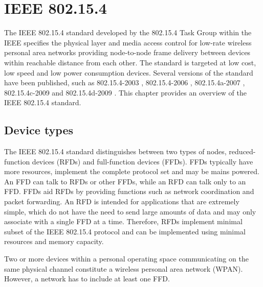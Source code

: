 \documentclass[12pt, titlepage, a4paper]{report}
\begin{document}
\chapter{IEEE 802.15.4}\label{ch:ieee802.15.4}
The IEEE 802.15.4 standard developed by the 802.15.4 Task Group within the IEEE specifies the physical layer and media access control for low-rate wireless personal area networks providing node-to-node frame delivery between devices within reachable distance from each other. The standard is targeted at low cost, low speed and low power consumption devices. Several versions of the standard have been published, such as 802.15.4-2003 \cite{ieee802.15.4}, 802.15.4-2006 \cite{ieee802.15.4-2006}, 802.15.4a-2007 \cite{ieee802.15.4a-2007}, 802.15.4c-2009 \cite{ieee802.15.4c-2009} and 802.15.4d-2009 \cite{ieee802.15.4d-2009} . This chapter provides an overview of the IEEE 802.15.4 standard.

\section{Device types}
The IEEE 802.15.4 standard distinguishes between two types of nodes, reduced-function devices (RFDs) and full-function devices (FFDs). FFDs typically have more resources, implement the complete protocol set and may be mains powered. An FFD can talk to RFDs or other FFDs, while an RFD can talk only to an FFD. FFDs aid RFDs by providing functions such as network coordination and packet forwarding. An RFD is intended for applications that are extremely simple, which do not have the need to send large amounts of data and may only associate with a single FFD at a time. Therefore, RFDs implement minimal subset of the IEEE 802.15.4 protocol and can be implemented using minimal resources and memory capacity.

Two or more devices within a personal operating space communicating on the same physical channel constitute a wireless personal area network (WPAN). However, a network has to include at least one FFD.
\end{document}
